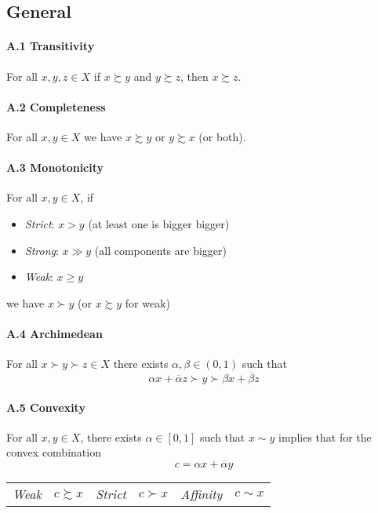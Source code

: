 \documentclass[landscape, 12pt]{extarticle}
\begin{document}
\begin{multicols}{2}
	\subsection{General}

	\paragraph{A.1 Transitivity}
	For all $x, y, z \in X$ if $x \succsim y$ and $y \succsim z$, then $x \succsim z$.

	\paragraph{A.2 Completeness}
	For all $x, y \in X$ we have $x \succsim y$ or $y \succsim x$ (or both).

	\paragraph{A.3 Monotonicity}
	For all $x, y \in X$, if
	\begin{itemize}
		\item \textit{Strict}: $x>y$ (at least one is bigger bigger)
		\item \textit{Strong}: $x \gg y$ (all components are bigger)
		\item \textit{Weak}: $x \geq y$
	\end{itemize}
	we have $x \succ y$ (or $x\succsim y$ for weak)

	\paragraph{A.4 Archimedean}
	For all $x \succ y \succ z \in X$ there exists $\alpha, \beta \in (0, 1)$ such that
	\[
		\alpha x + \overline \alpha z \succ y \succ \beta x + \overline \beta z
	\]

	\paragraph{A.5 Convexity}
	For all $x, y \in X$, there exists $\alpha \in [0, 1]$ such that $x \sim y$ implies
	that for the convex combination
	\[
		c = \alpha x + \overline \alpha y
	\]
	\begin{center}
		\begin{tabular}{cc|cc|cc}
			\textit{Weak}     & $c \succsim x$ &
			\textit{Strict}   & $c \succ x$    &
			\textit{Affinity} & $c \sim x$       \\
		\end{tabular}
	\end{center}


\end{multicols}
\end{document}
